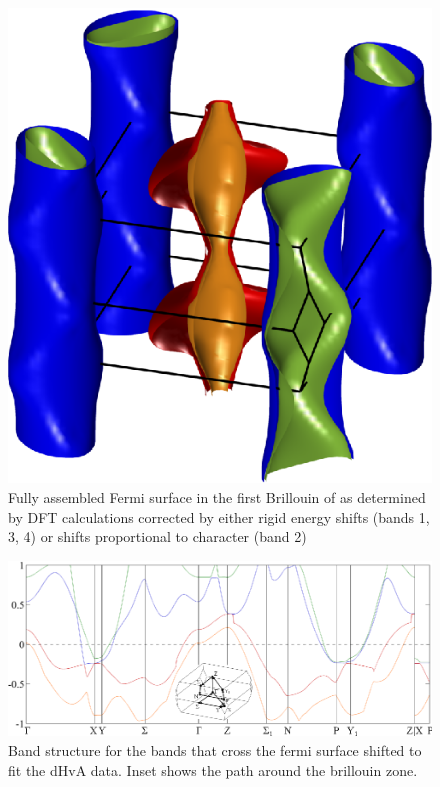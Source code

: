 \begin{figure}[htbp]
    \begin{center}
        \includegraphics[scale=0.7]{Chapter-dHvABaFe2P2/Figures/AngleDepMeasurements/BandCharacterFermiSurface/FullBandCharacterFermiSurface}
        \caption{Fully assembled Fermi surface in the first Brillouin of \BaFeP as determined by DFT calculations corrected by either rigid energy shifts (bands 1, 3, 4) or shifts proportional to \DzTwo character (band 2)}
        \label{Fig:ResD:FullBandCharacterFermiSurface}
    \end{center}
\end{figure}
\begin{figure}[htbp]
    \begin{center}
        \includegraphics[scale=0.95]{Chapter-dHvABaFe2P2/Figures/AngleDepMeasurements/ShiftedBandStructure/ShiftedBandStructure}
        \caption{Band structure for the bands that cross the fermi surface shifted to fit the dHvA data. Inset shows the path around the brillouin zone.}
        \label{Fig:ResD:ShiftedBandStructure}
    \end{center}
\end{figure}

